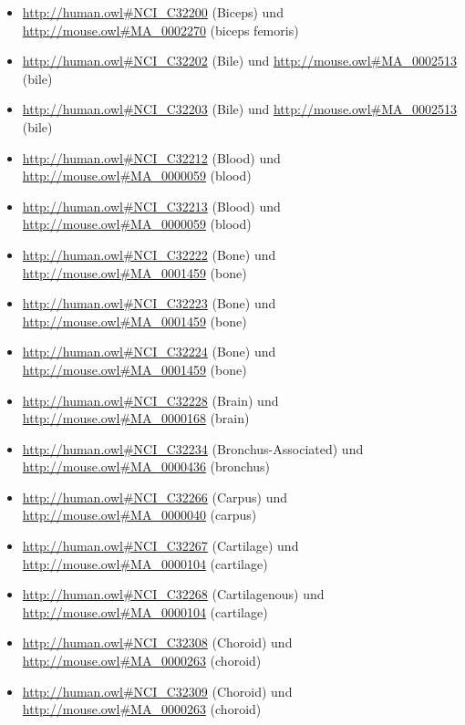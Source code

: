 \begin{itemize}
	\item \url{http://human.owl#NCI_C32200} (Biceps) und \url{http://mouse.owl#MA_0002270} (biceps femoris)
	\item \url{http://human.owl#NCI_C32202} (Bile\textunderscoreCanaliculus) und \url{http://mouse.owl#MA_0002513} (bile)
	\item \url{http://human.owl#NCI_C32203} (Bile\textunderscoreSalt) und \url{http://mouse.owl#MA_0002513} (bile)
	\item \url{http://human.owl#NCI_C32212} (Blood\textunderscoreCapillary) und \url{http://mouse.owl#MA_0000059} (blood)
	\item \url{http://human.owl#NCI_C32213} (Blood\textunderscoreVessel\textunderscoreTissue) und \url{http://mouse.owl#MA_0000059} (blood)
	\item \url{http://human.owl#NCI_C32222} (Bone\textunderscoreMatrix) und \url{http://mouse.owl#MA_0001459} (bone)
	\item \url{http://human.owl#NCI_C32223} (Bone\textunderscoreof\textunderscorethe\textunderscoreExtremity) und \url{http://mouse.owl#MA_0001459} (bone)
	\item \url{http://human.owl#NCI_C32224} (Bone\textunderscoreSurface) und \url{http://mouse.owl#MA_0001459} (bone)
	\item \url{http://human.owl#NCI_C32228} (Brain\textunderscoreInfundibulum) und \url{http://mouse.owl#MA_0000168} (brain)
	\item \url{http://human.owl#NCI_C32234} (Bronchus-Associated\textunderscoreLymphoid\textunderscoreTissue) und \url{http://mouse.owl#MA_0000436} (bronchus)
	\item \url{http://human.owl#NCI_C32266} (Carpus\textunderscoreBone) und \url{http://mouse.owl#MA_0000040} (carpus)
	\item \url{http://human.owl#NCI_C32267} (Cartilage\textunderscoreMatrix) und \url{http://mouse.owl#MA_0000104} (cartilage)
	\item \url{http://human.owl#NCI_C32268} (Cartilagenous\textunderscoreTissue) und \url{http://mouse.owl#MA_0000104} (cartilage)
	\item \url{http://human.owl#NCI_C32308} (Choroid\textunderscorePlexus\textunderscoreof\textunderscorethe\textunderscoreFourth\textunderscoreVentricle) und \url{http://mouse.owl#MA_0000263} (choroid)
	\item \url{http://human.owl#NCI_C32309} (Choroid\textunderscorePlexus\textunderscoreof\textunderscorethe\textunderscoreLateral\textunderscoreVentricle) und \url{http://mouse.owl#MA_0000263} (choroid)

\end{itemize}
